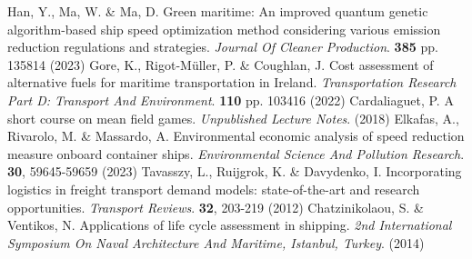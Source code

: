 \documentclass[a4paper,12pt]{article}
\begin{document}
\begin{thebibliography}{2}
	Han, Y., Ma, W. \& Ma, D. Green maritime: An improved quantum genetic algorithm-based ship speed optimization method considering various emission reduction regulations and strategies. {\em Journal Of Cleaner Production}. \textbf{385} pp. 135814 (2023)
	Gore, K., Rigot-Müller, P. \& Coughlan, J. Cost assessment of alternative fuels for maritime transportation in Ireland. {\em Transportation Research Part D: Transport And Environment}. \textbf{110} pp. 103416 (2022)
	Cardaliaguet, P. A short course on mean field games. {\em Unpublished Lecture Notes}. (2018)
	Elkafas, A., Rivarolo, M. \& Massardo, A. Environmental economic analysis of speed reduction measure onboard container ships. {\em Environmental Science And Pollution Research}. \textbf{30}, 59645-59659 (2023)
	Tavasszy, L., Ruijgrok, K. \& Davydenko, I. Incorporating logistics in freight transport demand models: state-of-the-art and research opportunities. {\em Transport Reviews}. \textbf{32}, 203-219 (2012)
	Chatzinikolaou, S. \& Ventikos, N. Applications of life cycle assessment in shipping. {\em 2nd International Symposium On Naval Architecture And Maritime, Istanbul, Turkey}. (2014)

\end{thebibliography}
\end{document}
